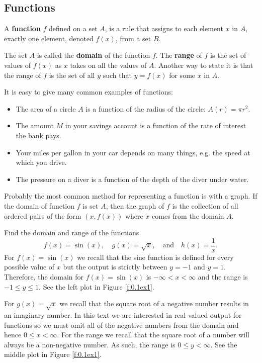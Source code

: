 \subsection*{Functions}
\begin{definition}
    A {\bf function} $f$ defined on a set $A$, is a rule that assigns to each element $x$ in $A$,
exactly one element, denoted $f(x)$, from a set $B$. 

\noindent The set $A$ is called the {\bf domain} of the function $f$. The {\bf range} of $f$ is the set
of values of $f(x)$
as $x$ takes on all the values of $A$.  Another way to state it is that the range of $f$ is the
set of all $y$ such that $y=f(x)$ for some $x$ in $A$.
\end{definition}

It is easy to give many common examples of functions:
\begin{itemize}
    \item The area of a circle $A$ is a function of the radius of the circle:  $A(r)= \pi r^2$.
    \item The amount $M$ in your savings account is a function of the rate of interest the
        bank pays.
    \item Your miles per gallon in your car depends on many things, e.g. the speed at
        which you drive.  
    \item The pressure on a diver is a function of the depth of the diver under water.
\end{itemize}

Probably the most common method for representing a function is with a graph.  If the
domain of function $f$ is set $A$, then the graph of $f$ is the collection of all ordered
pairs of the form $(x,f(x))$ where $x$ comes from the domain $A$.





\bex
Find the domain and range of the functions
\[ f(x) = \sin(x), \quad g(x) = \sqrt{x}, \quad \text{and} \quad h(x) =
    \frac{1}{x}. \]
\eex
For $f(x)=\sin(x)$ we recall that the sine function is defined for every possible value of $x$ but
the output is strictly between $y=-1$ and $y=1$.  Therefore, the domain for $f(x) =
\sin(x)$ is $-\infty < x < \infty$ and the range is $-1 \le y \le 1$.  See the left plot
in Figure \ref{f:0.1ex1}.

For $g(x) = \sqrt{x}$ we recall that the square root of a negative number results in an
imaginary number.  In this text we are interested in real-valued output for functions so
we must omit all of the negative numbers from the domain and hence $0 \le x < \infty$.
For the range we recall that the square root of a number will always be a non-negative
number.  As such, the range is $0 \le y < \infty$.  See the middle plot
in Figure \ref{f:0.1ex1}.

